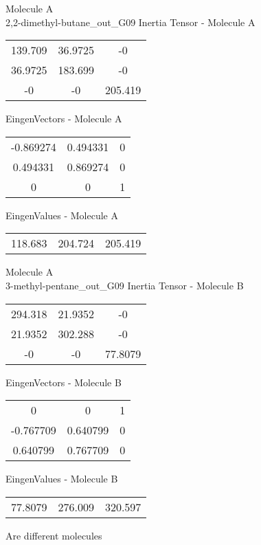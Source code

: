 \newpage
\begin{multicols}{2}
\begin{center}
Molecule A \\ 
2,2-dimethyl-butane_out_G09
Inertia Tensor - Molecule A \\
\vtab
\begin{tabular}{|c c c|}
139.709	 & 	36.9725	 & 	-0	 \\
36.9725	 & 	183.699	 & 	-0	 \\
-0	 & 	-0	 & 	205.419
\end{tabular}

\vtab
 EingenVectors - Molecule A     \\
\vtab
\begin{tabular}{|c c c|}
-0.869274	 & 	0.494331	 & 	0	 \\
0.494331	 & 	0.869274	 & 	0	 \\
0	 & 	0	 & 	1
\end{tabular}

\vtab
 EingenValues - Molecule A     \\
\vtab
\begin{tabular}{|c c c|}
118.683	 & 	204.724	 & 	205.419
\end{tabular}
\columnbreak
Molecule A \\ 
3-methyl-pentane_out_G09
Inertia Tensor - Molecule B \\
\vtab
\begin{tabular}{|c c c|}
294.318	 & 	21.9352	 & 	-0	 \\
21.9352	 & 	302.288	 & 	-0	 \\
-0	 & 	-0	 & 	77.8079
\end{tabular}

\vtab
 EingenVectors - Molecule B     \\
\vtab
\begin{tabular}{|c c c|}
0	 & 	0	 & 	1	 \\
-0.767709	 & 	0.640799	 & 	0	 \\
0.640799	 & 	0.767709	 & 	0
\end{tabular}

\vtab
 EingenValues - Molecule B     \\
\vtab
\begin{tabular}{|c c c|}
77.8079	 & 	276.009	 & 	320.597
\end{tabular}
\textcolor{NavyBlue}{\large Are different molecules}
\end{center}
\end{multicols}
